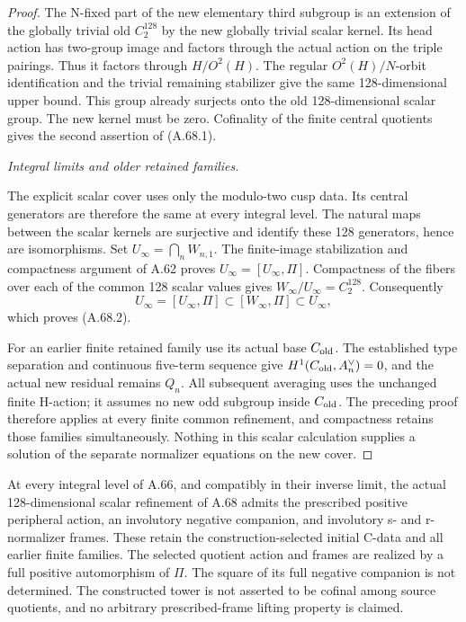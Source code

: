 \begin{proof}
The N-fixed part of the new elementary third subgroup is an
extension of the globally trivial old \(C_2^{128}\) by the
new globally trivial scalar kernel. Its head action has two-group
image and factors through the actual action on the triple pairings.
Thus it factors through \(H/O^2(H)\). The regular
\(O^2(H)/N\)-orbit identification and the trivial remaining
stabilizer give the same 128-dimensional upper bound. This group
already surjects onto the old 128-dimensional scalar group.
The new kernel must be zero. Cofinality of the finite central
quotients gives the second assertion of (A.68.1).

\emph{Integral limits and older retained families.}\par
The explicit scalar cover uses only the modulo-two cusp data.
Its central generators are therefore the same at every integral
level. The natural maps between the scalar kernels are surjective
and identify these 128 generators, hence are isomorphisms.
Set \(U_\infty=\bigcap_nW_{n,1}\). The finite-image
stabilization and compactness argument of A.62 proves
\(U_\infty=[U_\infty,\Pi]\). Compactness of the fibers over
each of the common 128 scalar values gives
\(W_\infty/U_\infty=C_2^{128}\). Consequently
\[
 U_\infty=[U_\infty,\Pi]
 \subset[W_\infty,\Pi]\subset U_\infty,
\]
which proves (A.68.2).

For an earlier finite retained family use its actual base
\(C_{\rm old}\). The established type separation and continuous
five-term sequence give \(H^1(C_{\rm old},A_n^\vee)=0\),
and the actual new residual remains \(Q_n\). All subsequent
averaging uses the unchanged finite H-action; it assumes no
new odd subgroup inside \(C_{\rm old}\). The preceding proof
therefore applies at every finite common refinement, and
compactness retains those families simultaneously. Nothing in
this scalar calculation supplies a solution of the separate
normalizer equations on the new cover.
\end{proof}


At every integral level of A.66, and compatibly in their inverse limit,
the actual 128-dimensional scalar refinement of A.68 admits the
prescribed positive peripheral action,
an involutory negative companion, and involutory s- and r-normalizer
frames. These retain the construction-selected initial C-data and
all earlier finite families. The selected quotient action and frames
are realized by a full positive automorphism of \(\Pi\).
The square of its full negative companion is not determined.
The constructed tower is not asserted to be cofinal among source
quotients, and no arbitrary prescribed-frame lifting property is claimed.

